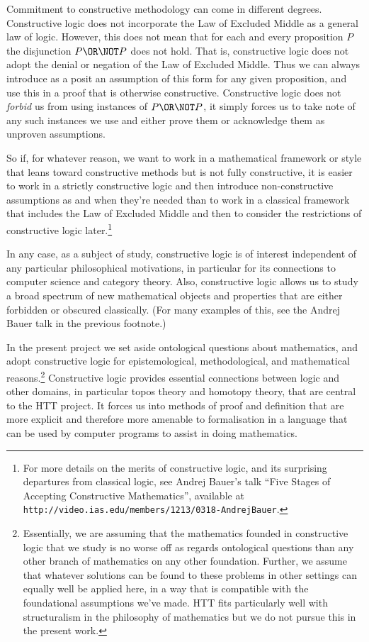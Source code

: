Commitment to constructive methodology can come in different degrees. 
Constructive logic does not incorporate the Law of Excluded Middle as a general law of logic. 
However, this does not mean that for each and every proposition $P$ the disjunction $P \OR \NOT P$ does not hold. 
That is, constructive logic does not adopt the denial or negation of the Law of Excluded Middle. Thus we can always introduce as a posit an assumption of this form for any given proposition, and use this in a proof that is otherwise constructive.  Constructive logic does not \emph{forbid} us from using instances of $P \OR \NOT P$, it simply forces us to take note of any such instances we use and either prove them or acknowledge them as unproven assumptions.

So if, for whatever reason, we want to work in a mathematical framework or style that leans toward constructive methods but is not fully constructive, it is easier to work in a strictly constructive logic and then introduce non-constructive assumptions as and when they're needed than to work in a classical framework that includes the Law of Excluded Middle and then to consider the restrictions of constructive logic later.\footnote{For more details on the merits of constructive logic, and its surprising departures from classical logic,
see 
Andrej Bauer's talk ``Five Stages of Accepting Constructive Mathematics'', available at
\texttt{http://video.ias.edu/members/1213/0318-AndrejBauer}.
}

In any case, as a subject of  study, 
constructive logic is of interest independent of any particular philosophical motivations, in particular for its connections to computer science and category theory.  Also, constructive logic allows us to study a broad spectrum of new mathematical objects and properties that are either forbidden or obscured classically.  (For many examples of this, see the Andrej Bauer talk in the previous footnote.)

In the present project we set aside ontological questions about mathematics, and adopt constructive logic for epistemological, methodological, and mathematical reasons.\footnote{
Essentially, we are assuming that the mathematics founded in constructive logic that we study is no worse off as regards ontological questions 
than any other branch of mathematics on any other foundation. Further, we assume that whatever solutions can be found to these problems in other settings can equally well be applied here, in a way that is compatible with the foundational assumptions we've made. HTT fits particularly well with structuralism in the philosophy of mathematics but we do not pursue this in the present work.
} 
Constructive logic provides essential connections between logic and other domains, in particular topos theory and homotopy theory, that are central to the HTT project. It forces us into methods of proof and definition that are more explicit and therefore more amenable to formalisation in a language that can be used by computer programs to assist in doing mathematics. 

